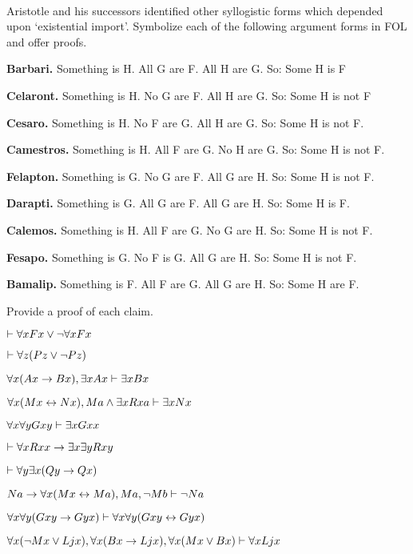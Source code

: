 \begin{practiceproblems}
\

\problempart
\label{pr.BarbaraEtc.proof2}
Aristotle and his successors identified other syllogistic forms which depended upon `existential import'. Symbolize each of the following argument forms in FOL and offer proofs.
\begin{ebullet}
	\item \textbf{Barbari.} Something is H. All G are F. All H are G. So: Some H is F
	\item \textbf{Celaront.} Something is H. No G are F. All H are G. So: Some H is not F
	\item \textbf{Cesaro.} Something is H. No F are G. All H are G. So: Some H is not F.
	\item \textbf{Camestros.} Something is H. All F are G. No H are G. So: Some H is not F.
	\item \textbf{Felapton.} Something is G. No G are F. All G are H. So: Some H is not F.
	\item \textbf{Darapti.} Something is G. All G are F. All G are H. So: Some H is F.
	\item \textbf{Calemos.} Something is H. All F are G. No G are H. So: Some H is not F.
	\item \textbf{Fesapo.} Something is G. No F is G. All G are H. So: Some H is not F.
	\item \textbf{Bamalip.} Something is F. All F are G. All G are H. So: Some H are F.
\end{ebullet}

\problempart
\label{pr.someFOLproofs}
Provide a proof of each claim.
\begin{earg}
\item $\vdash \forall x Fx \vee \neg \forall x Fx$
\item $\vdash\forall z (Pz \vee \neg Pz)$
\item $\forall x(Ax\rightarrow Bx), \exists x Ax \vdash \exists x Bx$
\item $\forall x(Mx \leftrightarrow Nx), Ma\mathbin{\wedge}\exists x Rxa\vdash \exists x Nx$
\item $\forall x \forall y Gxy\vdash\exists x Gxx$
\item $\vdash\forall x Rxx\rightarrow \exists x \exists y Rxy$
\item $\vdash\forall y \exists x (Qy \rightarrow Qx)$
\item $Na \rightarrow \forall x(Mx \leftrightarrow Ma), Ma, \neg Mb\vdash \neg Na$
\item $\forall x \forall y (Gxy \rightarrow Gyx) \vdash \forall x\forall y (Gxy \leftrightarrow Gyx)$
\item $\forall x(\neg Mx \vee Ljx), \forall x(Bx\rightarrow Ljx), \forall x(Mx\vee Bx)\vdash \forall xLjx$
\end{earg}


\end{practiceproblems}

